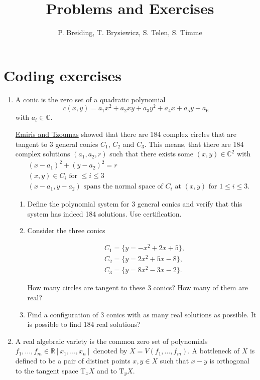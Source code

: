 \documentclass[11pt,reqno]{amsart}
\title{Problems and Exercises}
\author{P. Breiding, T. Brysiewicz, S. Telen, S. Timme}
\theoremstyle{definition}
\theoremstyle{remark}
\numberwithin{equation}{section}
\begin{document}
\maketitle
\tableofcontents

\section{Coding exercises}

\begin{enumerate}
\item A conic is the zero set of a quadratic polynomial
$$
c(x,y) = a_1 x^2 + a_2 x y + a_3 y^2 + a_4 x + a_5 y + a_6
$$
with $a_i \in \mathbb{C}$.

\href{http://www.win.tue.nl/EWCG2005/Proceedings/38.pdf}{Emiris and Tzoumas} showed that there are 184 complex circles that are tangent to 3 general conics $C_1$, $C_2$ and $C_3$. This means, that there are 184 complex solutions $(a_1,a_2,r)$ such that there exists some $(x,y)\in\mathbb{C}^2$ with
\begin{align*}
&(x-a_1)^2 + (y-a_2)^2 = r\\
&(x,y)\in C_i \text{ for } \leq i\leq 3\\
&(x-a_1, y-a_2) \text{ spans the normal space of $C_i$ at $(x,y)$ for $1\leq i\leq 3$.}
\end{align*}

\begin{enumerate}
\item Define the polynomial system for 3 general conics and verify that this system has indeed 184 solutions. Use certification.

\item
Consider the three conics

\begin{align*}
&C_1 = \{y=-x^2+2x+5\},\\
&C_2 = \{y = 2x^2+5x-8\},\\
&C_3 = \{y = 8x^2-3x-2\}.
\end{align*}

How many circles are tangent to these 3 conics? How many of them are real?

\item Find a configuration of 3 conics with as many real solutions as possible. It is possible to find 184 real solutions?

\end{enumerate}

\item A real algebraic variety is the common zero set of polynomials $f_1, \ldots, f_m \in \mathbb{R}[x_1,\ldots,x_n]$ denoted by $X=V(f_1,\ldots,f_m)$. A bottleneck of $X$ is defined to be a pair of distinct points $x, y \in X$ such that $x-y$ is orthogonal to the tangent space $\mathrm{T}_x X$ and to $\mathrm{T}_y X$.


\end{enumerate}
\end{document}
